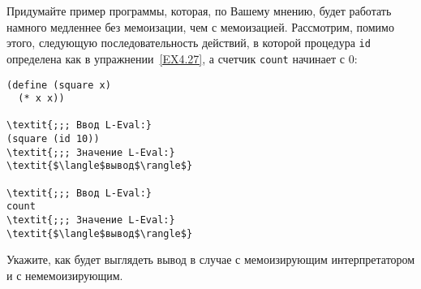 \begin{exercise}{4.29}%
\label{EX4.29}%
Придумайте пример программы, которая, по Вашему мнению,
будет работать намного медленнее без мемоизации, чем с мемоизацией.  
Рассмотрим, помимо этого, следующую последовательность действий, в которой 
процедура
{\tt id} определена как в упражнении~\ref{EX4.27},
а счетчик {\tt count} начинает с 0:

\begin{Verbatim}[fontsize=\small]
(define (square x)
  (* x x))

\textit{;;; Ввод L-Eval:}
(square (id 10))
\textit{;;; Значение L-Eval:}
\textit{$\langle$вывод$\rangle$}

\textit{;;; Ввод L-Eval:}
count
\textit{;;; Значение L-Eval:}
\textit{$\langle$вывод$\rangle$}
\end{Verbatim}
Укажите, как будет выглядеть вывод в случае с мемоизирующим интерпретатором и с
немемоизирующим.
\end{exercise}

